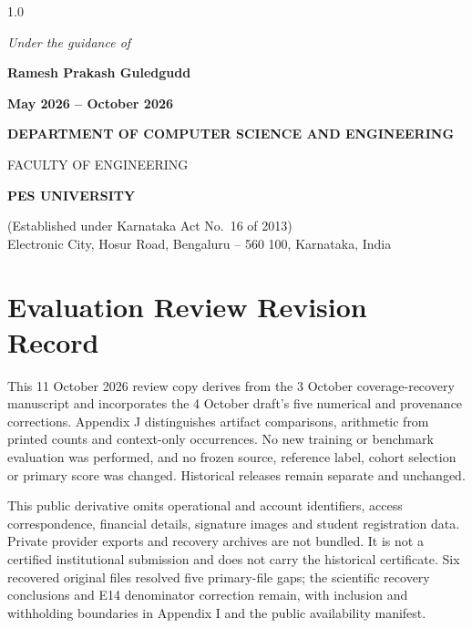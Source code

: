 \begin{titlepage}
\begin{spacing}{1.0}
\vspace{0.5em}
{\normalsize\itshape Under the guidance of\par}
\vspace{0.2em}
{\large\bfseries Ramesh Prakash Guledgudd\par}

\vspace{0.6em}
{\normalsize\bfseries\color{pesmaroon} May 2026 -- October 2026\par}

\vfill

{\normalsize\bfseries DEPARTMENT OF COMPUTER SCIENCE AND ENGINEERING\par}
{\normalsize FACULTY OF ENGINEERING\par}
{\large\bfseries PES UNIVERSITY\par}
{\footnotesize (Established under Karnataka Act No.\ 16 of 2013)\\
Electronic City, Hosur Road, Bengaluru -- 560 100, Karnataka, India\par}
\end{spacing}
\end{titlepage}



\chapter*{Evaluation Review Revision Record}
This 11 October 2026 review copy derives from the 3 October coverage-recovery manuscript and incorporates the 4 October draft's five numerical and provenance corrections. Appendix J distinguishes artifact comparisons, arithmetic from printed counts and context-only occurrences. No new training or benchmark evaluation was performed, and no frozen source, reference label, cohort selection or primary score was changed. Historical releases remain separate and unchanged.

This public derivative omits operational and account identifiers, access correspondence, financial details, signature images and student registration data. Private provider exports and recovery archives are not bundled. It is not a certified institutional submission and does not carry the historical certificate. Six recovered original files resolved five primary-file gaps; the scientific recovery conclusions and E14 denominator correction remain, with inclusion and withholding boundaries in Appendix I and the public availability manifest.

